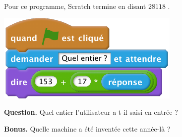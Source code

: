 \documentclass[class=report,crop=false, 12pt]{standalone}
\begin{document}


\begin{enigme}

Pour ce programme, Scratch termine en disant \og $28118$ \fg{}.

\begin{center}
  \includegraphics[scale=\scalebloc]{bloc-05-eg1} 
\end{center}


\bigskip

\textbf{Question.} Quel entier l'utilisateur a t-il saisi en entrée ?

\bigskip

\textbf{Bonus.} Quelle machine a été inventée cette année-là ?


\end{enigme}
\end{document}
